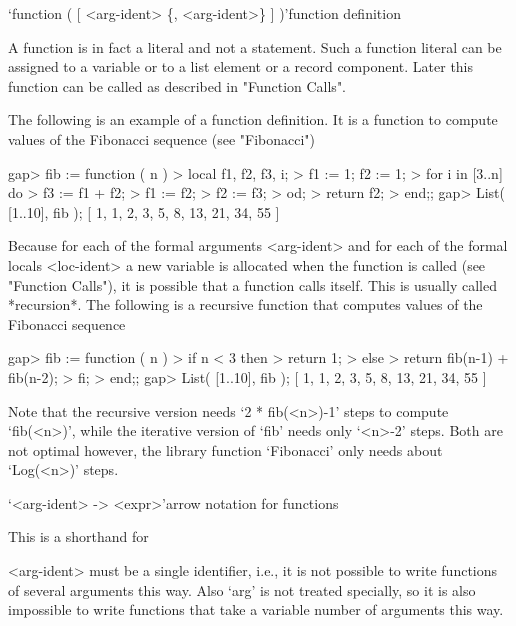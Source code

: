 {%

\>`function ( [ <arg-ident> \{, <arg-ident>\} ] )'{function definition}

A function is in fact a literal and not a statement. Such a function
literal can be assigned to a variable or to a list element or a record
component. Later this function can be called as described in "Function
Calls".

The following is an example of a function definition.  It is a function
to compute values of the Fibonacci sequence (see "Fibonacci")

\beginexample
gap> fib := function ( n )
>     local f1, f2, f3, i;
>     f1 := 1; f2 := 1;
>     for i in [3..n] do
>       f3 := f1 + f2;
>       f1 := f2;
>       f2 := f3;
>     od;
>     return f2;
>   end;;
gap> List( [1..10], fib );
[ 1, 1, 2, 3, 5, 8, 13, 21, 34, 55 ]
\endexample

Because for each of the formal arguments <arg-ident> and for each of the
formal locals <loc-ident> a new variable is allocated when the function
is called (see "Function Calls"), it is possible that a function calls
itself. This is usually called *recursion*. The following is a recursive
function that computes values of the Fibonacci sequence

\beginexample
gap> fib := function ( n )
>     if n < 3 then
>       return 1;
>     else
>       return fib(n-1) + fib(n-2);
>     fi;
>   end;;
gap> List( [1..10], fib );
[ 1, 1, 2, 3, 5, 8, 13, 21, 34, 55 ]
\endexample

Note that the recursive version needs `2 * fib(<n>)-1' steps to compute
`fib(<n>)', while the iterative version  of `fib' needs only `<n>-2'
steps.  Both are not optimal however, the library function `Fibonacci'
only needs about `Log(<n>)' steps.

\>`<arg-ident> -> <expr>'{arrow notation for functions}

This is a shorthand for


<arg-ident> must be a single identifier, i.e., it is not possible to
write functions of several arguments this way. Also `arg' is not treated
specially, so it is also impossible to write functions that take a
variable number of arguments this way.

}
